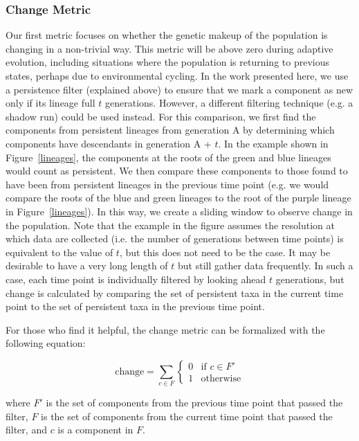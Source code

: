 \documentclass[letterpaper]{article}
\begin{document}
\subsubsection{Change Metric}
Our first metric focuses on whether the genetic makeup of the population is changing in a non-trivial way. This metric will be above zero during adaptive evolution, including situations where the population is returning to previous states, perhaps due to environmental cycling. In the work presented here, we use a persistence filter (explained above) to ensure that we mark a component as new only if its lineage full $t$ generations.  However, a different filtering technique (e.g. a shadow run) could be used instead. For this comparison, we first find the components from persistent lineages from generation A by determining which components have descendants in generation A + $t$. In the example shown in Figure~\ref{lineages}, the components at the roots of the green and blue lineages would count as persistent. We then compare these components to those found to have been from persistent lineages in the previous time point (e.g. we would compare the roots of the blue and green lineages to the root of the purple lineage in Figure~\ref{lineages}). In this way, we create a sliding window to observe change in the population. Note that the example in the figure assumes the resolution at which data are collected (i.e. the number of generations between time points) is equivalent to the value of $t$, but this does not need to be the case. It may be desirable to have a very long length of $t$ but still gather data frequently. In such a case, each time point is individually filtered by looking ahead $t$ generations, but change is calculated by comparing the set of persistent taxa in the current time point to the set of persistent taxa in the previous time point. 

For those who find it helpful, the change metric can be formalized with the following equation:

\begin{equation} \text{change} =    \sum_{c \in F}{\begin{cases}
      0 & \text{if } c \in F'\\
      1 &  \text{otherwise}  
   \end{cases}}
\label{eq:change}
\end{equation}

where $F'$ is the set of components from the previous time point that passed the filter, $F$ is the set of components from the current time point that passed the filter, and $c$ is a component in $F$.
\end{document}
